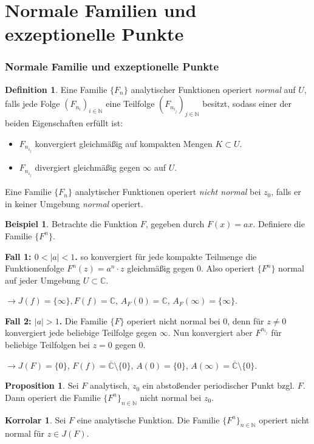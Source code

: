 \documentclass{beamer}
\renewcommand{\bar}{\overline}
\newcommand{\C}{\mathbb{C}}
\newcommand{\N}{\mathbb{N}}
\theoremstyle{definition}
\newcounter{foo}
\newtheorem{df}[foo]{Definition}
\newtheorem{kor}[foo]{Korrolar}
\newtheorem{ex}[foo]{Beispiel}
\newtheorem{prop}[foo]{Proposition}
\begin{document}
\section{Normale Familien und exzeptionelle Punkte}
\begin{frame}
\frametitle{Normale Familie und exzeptionelle Punkte}
\begin{df} \label{4}
Eine Familie $\{F_n\}$ analytischer Funktionen operiert \emph{normal} auf $U$, falls jede Folge $(F_{n_i})_{i\in \mathbb{N}}$ eine Teilfolge $(F_{n_{i_j}})_{j\in \N}$ besitzt, sodass einer der beiden Eigenschaften erfüllt ist:
\begin{itemize}
\item $F_{n_{i_j}}$ konvergiert gleichmäßig auf kompakten Mengen $K\subset U$.
\item $F_{n_{i_j}}$ divergiert gleichmäßig gegen $\infty$ auf $U$.
\end{itemize}
Eine Familie $\{F_n\}$ analytischer Funktionen operiert \emph{nicht normal} bei $z_0$, falls er in keiner Umgebung \emph{normal} operiert.
\end{df}
\end{frame}

\begin{frame}
\begin{ex}\label{5}
Betrachte die Funktion $F$, gegeben durch $F(x)=ax$. Definiere die Familie $\{F^n\}$.

\textbf{Fall 1: $0<|a|<1$.} so konvergiert für jede kompakte Teilmenge die Funktionenfolge $F^n(z)=a^n\cdot z$ gleichmäßig gegen 0. Also operiert $\{F^n\}$ normal auf jeder Umgebung $U\subset \C$. 

$\longrightarrow J(f)=\{\infty\}, F(f)=\mathbb{C}$, $A_F(0)=\C$, $A_F(\infty)=\{\infty\}$.

\textbf{Fall 2: $|a|>1$.} Die Familie $\{F\}$ operiert nicht normal bei $0$, denn für $z\neq 0$ konvergiert jede beliebige Teilfolge gegen $\infty$. Nun konvergiert aber $F^{n_{i_j}}$ für beliebige Teilfolgen bei $z=0$ gegen $0$.

$\longrightarrow J(F)=\{0\}$, $F(f)=\overline{\C}\setminus \{0\}$, $A(0)=\{0\}$, $A(\infty)=\bar{\C}\setminus \{0\}$. 
\end{ex}
\end{frame}

\begin{frame}
\begin{prop}\label{6}
Sei $F$ analytisch, $z_0$ ein abstoßender periodischer Punkt bzgl. $F$. Dann operiert die Familie $\{F^n\}_{n\in \N}$ nicht normal bei $z_0$.
\end{prop}

\begin{kor} \label{7}
Sei $F$ eine analytische Funktion. Die Familie $\{F^n\}_{n\in \N}$ operiert nicht normal für $z\in J(F)$.
\end{kor}
\end{frame}
\end{document}
